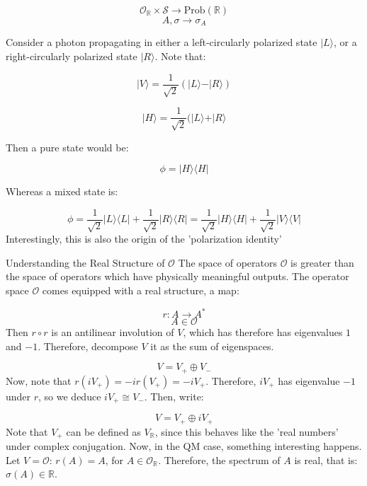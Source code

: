 $$\mathcal{O}_{\mathbb{R}} \times \mathcal{S} \to \text{Prob}(\mathbb{R})$$
$$A, \sigma \to \sigma_{A}$$

\begin{example}
Consider a photon propagating in either a left-circularly polarized state $\vert L \rangle$, or a right-circularly polarized state $\vert R \rangle$.
Note that:

$$\vert V \rangle = \frac{1}{\sqrt{2}} (\vert L \rangle - \vert R \rangle) $$

$$\vert H \rangle = \frac{1}{\sqrt{2}} (\vert L \rangle + \vert R \rangle $$

Then a pure state would be:

$$\phi = \vert H \rangle \langle H \vert$$

Whereas a mixed state is:

$$\phi = \frac{1}{\sqrt{2}} \vert L \rangle \langle L \vert + \frac{1}{\sqrt{2}} \vert R \rangle \langle R \vert = \frac{1}{\sqrt{2}} \vert H \rangle \langle H \vert + \frac{1}{\sqrt{2}} \vert V \rangle \langle V \vert$$
Interestingly, this is also the origin of the 'polarization identity'
\end{example}
\begin{example}{Understanding the Real Structure of $\mathcal{O}$}
The space of operators $\mathcal{O}$ is greater than the space of operators which have physically meaningful outputs. The operator space $\mathcal{O}$ comes equipped with a real structure, a map:

$$r: A \to A^{*}$$
$$A \in \mathcal{O}$$
Then $r \circ r$ is an antilinear involution of $V$, which has therefore has eigenvalues $1$ and $-1$. Therefore, decompose $V$ it as the sum of eigenspaces.

$$V = V_{+} \oplus V_{-} $$
Now, note that $r(i V_{+}) = -i r(V_{+}) = - iV_{+}$. Therefore, $iV_{+}$ has eigenvalue $-1$ under $r$, so we deduce $iV_{+} \cong V_{-}$. Then, write:

$$V = V_{+} \oplus i V_{+}$$
Note that $V_{+}$ can be defined as $V_{\mathbb{R}}$, since this behaves like the 'real numbers' under complex conjugation. Now, in the QM case, something interesting happens. Let $V = \mathcal{O}$: $r(A) = A$, for $A \in \mathcal{O}_{\mathbb{R}}$. Therefore, the spectrum of $A$ is real, that is: $\sigma(A) \in \mathbb{R}$. 
\end{example}

